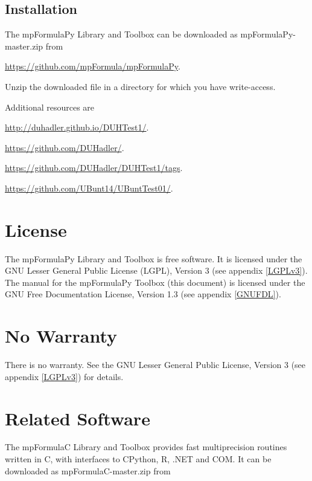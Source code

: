 \subsection{Installation}
\label{Installation}
The mpFormulaPy Library and Toolbox can be downloaded as mpFormulaPy-master.zip from 

\href{https://github.com/mpFormula/mpFormulaPy}{https://github.com/mpFormula/mpFormulaPy}. 

Unzip the downloaded file in a directory for which you have write-access.

\vpara

Additional resources are

\href{http://duhadler.github.io/DUHTest1/}{http://duhadler.github.io/DUHTest1/}. 


\href{https://github.com/DUHadler/}{https://github.com/DUHadler/}. 

\href{https://github.com/DUHadler/DUHTest1/tags}{https://github.com/DUHadler/DUHTest1/tags}. 

\href{https://github.com/UBunt14/UBuntTest01/}{https://github.com/UBunt14/UBuntTest01/}. 




\section{License}
\label{mpFormulaLicense}

The mpFormulaPy Library and Toolbox is free software. It is licensed under the GNU Lesser General Public License (LGPL), Version 3 (see appendix \ref{LGPLv3}).
The manual for the mpFormulaPy Toolbox (this document) is licensed under the GNU Free Documentation License, Version 1.3 (see appendix \ref{GNUFDL}).




\section{No Warranty}
\label{No Warranty} 

There is no warranty. See the GNU  Lesser General Public License, Version 3 (see appendix \ref{LGPLv3}) for details.


\section{Related Software}

The mpFormulaC  Library and Toolbox provides fast multiprecision routines written in C, with interfaces to CPython, R, .NET and COM. It can be downloaded as mpFormulaC-master.zip from 

